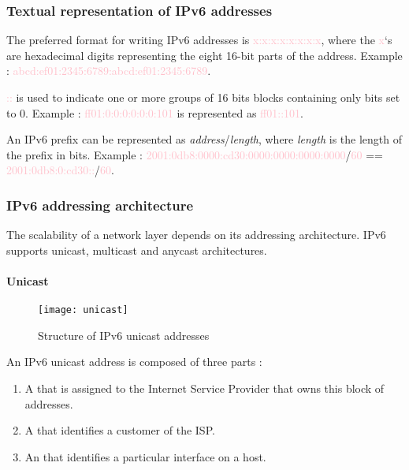 \subsubsection{Textual representation of IPv6 addresses}

The preferred format for writing IPv6 addresses is \textcolor{pink}{x:x:x:x:x:x:x:x}, where the \textcolor{pink}{x}‘s are hexadecimal digits representing the eight 16-bit parts of the address. Example : \textcolor{pink}{abcd:ef01:2345:6789:abcd:ef01:2345:6789}.

\textcolor{pink}{::} is used to indicate one or more groups of 16 bits blocks containing only bits set to 0. Example : \textcolor{pink}{ff01:0:0:0:0:0:0:101} is represented as \textcolor{pink}{ff01::101}.

An IPv6 prefix can be represented as \textit{address}/\textit{length}, where \textit{length} is the length of the prefix in bits. Example : \textcolor{pink}{2001:0db8:0000:cd30:0000:0000:0000:0000}/\textcolor{pink}{60} == \textcolor{pink}{2001:0db8:0:cd30::}/\textcolor{pink}{60}.

\subsubsection{IPv6 addressing architecture}

The scalability of a network layer depends on its addressing architecture. IPv6 supports unicast, multicast and anycast architectures.

\paragraph{Unicast}

\begin{minipage}{0.55\textwidth}
	\begin{figure}[H]
	    \centering
	    \texttt{[image: unicast]}
	    \caption{Structure of IPv6 unicast addresses}
	\end{figure}
\end{minipage}
\begin{minipage}{0.44\textwidth}
	An IPv6 unicast address is composed of three parts :
	\begin{enumerate}
	\item A  that is assigned to the Internet Service Provider that owns this block of addresses.
	\item A  that identifies a customer of the ISP.
	\item An  that identifies a particular interface on a host.
	\end{enumerate}
\end{minipage}

